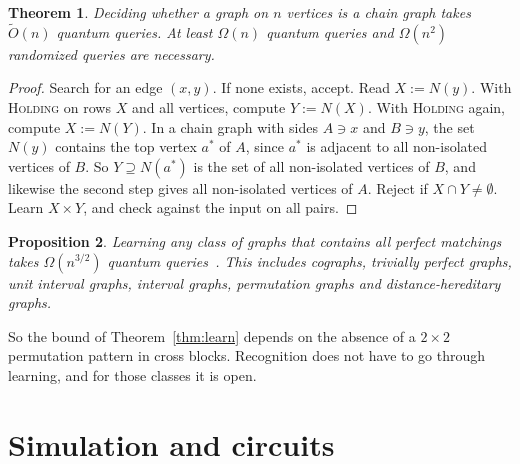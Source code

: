 \documentclass[11pt]{article}
\newtheorem{theorem}{Theorem}[section]
\newtheorem{proposition}[theorem]{Proposition}
\theoremstyle{remark}
\newcommand{\Ot}{\tilde O}
\newcommand{\AlgHold}{\textup{\textsc{Holding}}}
\begin{document}
\begin{theorem}\label{thm:chain}
Deciding whether a graph on $n$ vertices is a chain graph takes $\Ot(n)$ quantum queries. At least $\Omega(n)$ quantum queries and $\Omega(n^2)$ randomized queries are necessary.
\end{theorem}
\begin{proof}
Search for an edge $(x,y)$. If none exists, accept. Read $X:=N(y)$. With \AlgHold{} on rows $X$ and all vertices, compute $Y:=N(X)$. With \AlgHold{} again, compute $X:=N(Y)$. In a chain graph with sides $A\ni x$ and $B\ni y$, the set $N(y)$ contains the top vertex $a^*$ of $A$, since $a^*$ is adjacent to all non-isolated vertices of $B$. So $Y\supseteq N(a^*)$ is the set of all non-isolated vertices of $B$, and likewise the second step gives all non-isolated vertices of $A$. Reject if $X\cap Y\ne\emptyset$. Learn $X\times Y$, and check against the input on all pairs.
\end{proof}

\begin{proposition}\label{prop:matchings}
Learning any class of graphs that contains all perfect matchings takes $\Omega(n^{3/2})$ quantum queries~\cite{MSZ25}. This includes cographs, trivially perfect graphs, unit interval graphs, interval graphs, permutation graphs and distance-hereditary graphs.
\end{proposition}

So the bound of Theorem~\ref{thm:learn} depends on the absence of a $2\times 2$ permutation pattern in cross blocks. Recognition does not have to go through learning, and for those classes it is open.

\section{Simulation and circuits}\label{sec:sim}
\end{document}
